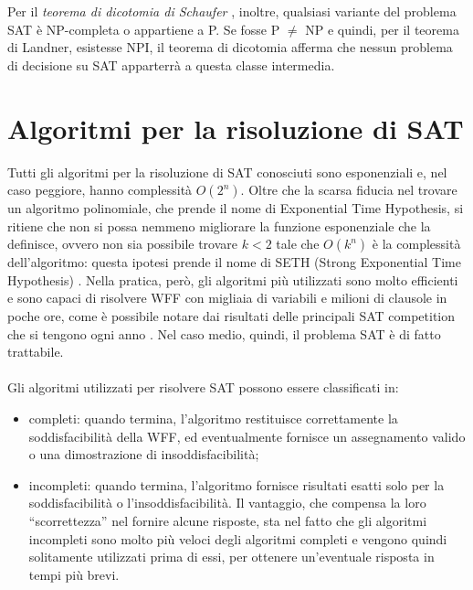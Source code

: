 Per il \textit{teorema di dicotomia di Schaufer} \cite{dichotomy-theorem}, inoltre, qualsiasi variante del problema SAT
è NP-completa o appartiene a P.
Se fosse P $\neq$ NP e quindi, per il teorema di Landner, esistesse NPI, il teorema di dicotomia
afferma che nessun problema di decisione su SAT apparterrà a questa classe intermedia. 



\section{Algoritmi per la risoluzione di SAT}
Tutti gli algoritmi per la risoluzione di SAT conosciuti sono esponenziali e, nel caso peggiore, hanno
complessità $O(2^n)$.
Oltre che la scarsa fiducia nel trovare un algoritmo polinomiale, che prende il nome di Exponential Time Hypothesis, 
si ritiene che non si possa nemmeno migliorare la funzione esponenziale che la definisce, ovvero non sia possibile 
trovare $k < 2$ tale che $O(k^n)$ è la complessità
dell'algoritmo: questa ipotesi prende il nome di SETH (Strong Exponential Time Hypothesis) \cite{seth}.
Nella pratica, però, gli algoritmi più utilizzati sono molto efficienti e sono capaci di risolvere WFF con migliaia
di variabili e milioni di clausole in poche ore, come è possibile notare dai risultati delle principali SAT competition
che si tengono ogni anno \cite{sat-competition}.
Nel caso medio, quindi, il problema SAT è di fatto trattabile.\\
\\
Gli algoritmi utilizzati per risolvere SAT possono essere classificati in:
\begin{itemize}
    \item completi: quando termina, l'algoritmo restituisce correttamente la soddisfacibilità della WFF, ed eventualmente
    fornisce un assegnamento valido o una dimostrazione di insoddisfacibilità;
    \item incompleti: quando termina, l'algoritmo fornisce risultati esatti solo per la soddisfacibilità o l'insoddisfacibilità.
    Il vantaggio, che compensa la loro “scorrettezza” nel fornire alcune risposte, sta nel fatto che gli algoritmi incompleti sono molto più veloci 
    degli algoritmi completi e vengono quindi solitamente utilizzati prima di essi, per ottenere un'eventuale
    risposta in tempi più brevi.
\end{itemize}

